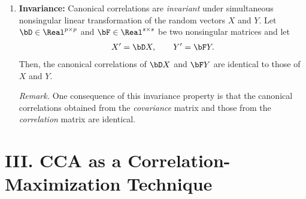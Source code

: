 \documentclass[12pt]{article}
\begin{document}
\begin{enumerate}[label=\textbf{\arabic*.}]
	\item \textbf{Invariance:} Canonical correlations are \textit{invariant} under simultaneous nonsingular linear transformation of the random vectors $X$ and $Y$. Let $\bD \in \Real^{p \times p}$ and $\bF \in \Real^{s \times s}$ be two nonsingular matrices and let
	\begin{align*}
		X' = \bD X, \qquad Y' = \bF Y. 
	\end{align*}
	Then, the canonical correlations of $\bD X$ and $\bF Y$ are identical to those of $X$ and $Y$. 
	
	\textit{Remark.} One consequence of this invariance property is that the canonical correlations obtained from the \emph{covariance} matrix and those from the \emph{correlation} matrix are identical. 
	
\end{enumerate}


\section*{III. CCA as a Correlation-Maximization Technique}
\end{document}
